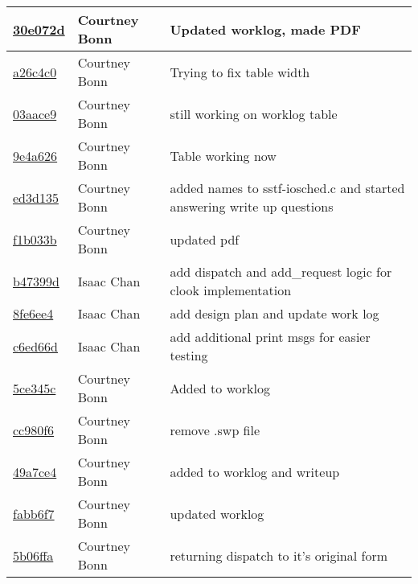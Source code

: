 \begin{tabular}{p{2cm} p{2cm} p{10cm}}
\href{https://github.com/courtbonn/CS-444/commit/30e072d1c632099297d1bb209b35dcd3bdb02a25}{30e072d} & Courtney Bonn & Updated worklog, made PDF\\\hline
\href{https://github.com/courtbonn/CS-444/commit/a26c4c0fa92b54d5e3198893ae7ef6e9b5fe139a}{a26c4c0} & Courtney Bonn & Trying to fix table width\\\hline
\href{https://github.com/courtbonn/CS-444/commit/03aace950555c852e351dff046443684678ff246}{03aace9} & Courtney Bonn & still working on worklog table\\\hline
\href{https://github.com/courtbonn/CS-444/commit/9e4a626bb9d41d55f124095a31341da5947303d9}{9e4a626} & Courtney Bonn & Table working now\\\hline
\href{https://github.com/courtbonn/CS-444/commit/ed3d13596e17bb82b25c641cbddec202cbe0e020}{ed3d135} & Courtney Bonn & added names to sstf-iosched.c and started answering write up questions\\\hline
\href{https://github.com/courtbonn/CS-444/commit/f1b033bfdcadb8aa0d9af64fd1d6963bdad423e3}{f1b033b} & Courtney Bonn & updated pdf\\\hline
\href{https://github.com/courtbonn/CS-444/commit/b47399d0a5fbc173d73f4f61c1fb1b70f72ca61a}{b47399d} & Isaac Chan & add dispatch and add\_request logic for clook implementation\\\hline
\href{https://github.com/courtbonn/CS-444/commit/8fe6ee4f10e247f5d23c7d082d700fbc7222bbc8}{8fe6ee4} & Isaac Chan & add design plan and update work log\\\hline
\href{https://github.com/courtbonn/CS-444/commit/c6ed66dde259cdf2e290ae5e6885c93ed571b4e7}{c6ed66d} & Isaac Chan & add additional print msgs for easier testing\\\hline
\href{https://github.com/courtbonn/CS-444/commit/5ce345ceb6730fcccacd41f08dc4b3f99c7bb053}{5ce345c} & Courtney Bonn & Added to worklog\\\hline
\href{https://github.com/courtbonn/CS-444/commit/cc980f65b008bd8d30c7d09f934ac11b45b6adab}{cc980f6} & Courtney Bonn & remove .swp file\\\hline
\href{https://github.com/courtbonn/CS-444/commit/49a7ce4718347c93bcb150d53fc5f71355bee0fe}{49a7ce4} & Courtney Bonn & added to worklog and writeup\\\hline
\href{https://github.com/courtbonn/CS-444/commit/fabb6f781a78d68466cc8c23156d25d426f5e2fd}{fabb6f7} & Courtney Bonn & updated worklog\\\hline
\href{https://github.com/courtbonn/CS-444/commit/5b06ffa743ac23d5ffb0b7a4985f121b9b56e6ca}{5b06ffa} & Courtney Bonn & returning dispatch to it's original form\\\hline

\end{tabular}
